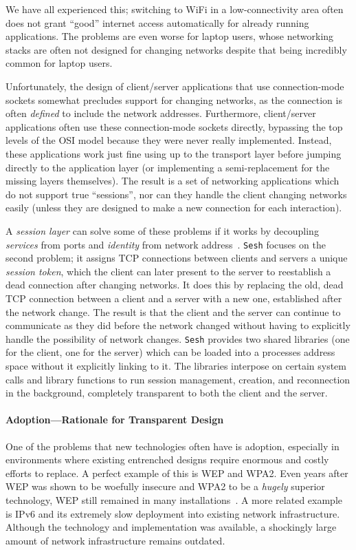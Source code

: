 \documentclass[twocolumn,11pt]{article}
\newcommand{\Sesh}{\texttt{Sesh}\xspace}
\begin{document}
We have all experienced this; switching to WiFi in a low-connectivity area often
does not grant ``good'' internet access automatically for already running
applications. The problems are even worse for laptop users, whose networking
stacks are often not designed for changing networks despite that being
incredibly common for laptop users.

Unfortunately, the design of client/server applications that use connection-mode
sockets somewhat precludes support for changing networks, as the connection is
often \textit{defined} to include the network addresses. Furthermore,
client/server applications often use these connection-mode sockets directly,
bypassing the top levels of the OSI model because they were never really
implemented. Instead, these applications work just fine using up to the
transport layer before jumping directly to the application layer (or
implementing a semi-replacement for the missing layers themselves). The result
is a set of networking applications which do not support true ``sessions'', nor
can they handle the client changing networks easily (unless they are designed to
make a new connection for each interaction).

A \textit{session layer} can solve some of these problems if it works by
decoupling \textit{services} from ports and \textit{identity} from network
address~\cite{wasptr-15-01,chandrashekar2003service}.
\Sesh focuses on the second problem; it assigns TCP connections between
clients and servers a unique \textit{session token}, which the client can later
present to the server to reestablish a dead connection after changing networks.
It does this by replacing the old, dead TCP connection between a client and a
server with a new one, established after the network change. The result is that
the client and the server can continue to communicate as they did before the
network changed without having to explicitly handle the possibility of network
changes. \Sesh provides two shared libraries (one for the client, one for the
server) which can be loaded into a processes address space without it
explicitly linking to it. The libraries interpose on certain system calls and
library functions to run session management, creation, and reconnection in the
background, completely transparent to both the client and the server.

\paragraph{Adoption---Rationale for Transparent Design}
One of the problems that new technologies often have is adoption, especially in environments
where existing entrenched designs require enormous and costly efforts to
replace. A perfect example of this is WEP and WPA2. Even years after WEP was
shown to be woefully insecure and WPA2 to be a \textit{hugely} superior
technology, WEP still remained in many installations~\cite{bittau2006sp}. A more
related example is IPv6 and its extremely slow deployment into existing network
infrastructure. Although the technology and implementation was available, a
shockingly large amount of network infrastructure remains outdated.
\end{document}

